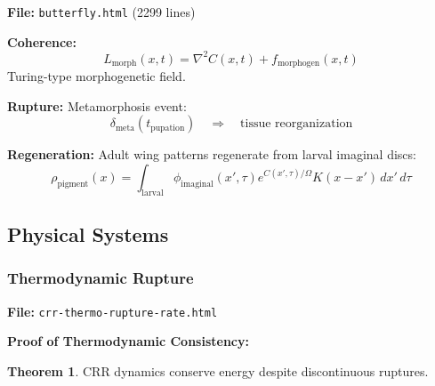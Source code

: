 \documentclass[11pt,a4paper]{article}
\theoremstyle{definition}
\newtheorem{theorem}{Theorem}[section]
\theoremstyle{remark}
\begin{document}
\textbf{File:} \texttt{butterfly.html} (2299 lines)

\textbf{Coherence:}
\begin{equation}
L_{\text{morph}}(x,t) = \nabla^2 C(x,t) + f_{\text{morphogen}}(x,t)
\end{equation}
Turing-type morphogenetic field.

\textbf{Rupture:} Metamorphosis event:
\begin{equation}
\delta_{\text{meta}}(t_{\text{pupation}}) \quad \Rightarrow \quad \text{tissue reorganization}
\end{equation}

\textbf{Regeneration:} Adult wing patterns regenerate from larval imaginal discs:
\begin{equation}
\rho_{\text{pigment}}(x) = \int_{\text{larval}} \phi_{\text{imaginal}}(x',\tau) e^{C(x',\tau)/\Omega} K(x-x')\,dx'\,d\tau
\end{equation}

\subsection{Physical Systems}

\subsubsection{Thermodynamic Rupture}

\textbf{File:} \texttt{crr-thermo-rupture-rate.html}

\textbf{Proof of Thermodynamic Consistency:}
\label{sec:thermo-proof}

\begin{theorem}
CRR dynamics conserve energy despite discontinuous ruptures.
\end{theorem}
\end{document}
